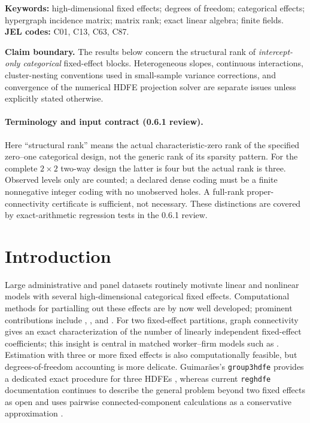 \documentclass[11pt]{article}
\theoremstyle{definition}
\newcommand{\1}{\mathbf{1}}
\begin{document}
\noindent\textbf{Keywords:} high-dimensional fixed effects; degrees of freedom; categorical effects; hypergraph incidence matrix; matrix rank; exact linear algebra; finite fields.\\
\textbf{JEL codes:} C01, C13, C63, C87.

\vspace{0.75em}
\noindent\textbf{Claim boundary.} The results below concern the structural rank of \emph{intercept-only categorical} fixed-effect blocks. Heterogeneous slopes, continuous interactions, cluster-nesting conventions used in small-sample variance corrections, and convergence of the numerical HDFE projection solver are separate issues unless explicitly stated otherwise.

\paragraph{Terminology and input contract (0.6.1 review).}
Here ``structural rank'' means the actual characteristic-zero rank of the specified
zero--one categorical design, not the generic rank of its sparsity pattern.
For the complete $2\times2$ two-way design the latter is four but the actual rank
is three. Observed levels only are counted; a declared dense coding must be a
finite nonnegative integer coding with no unobserved holes. A full-rank
proper-connectivity certificate is sufficient, not necessary. These distinctions
are covered by exact-arithmetic regression tests in the 0.6.1 review.

\section{Introduction}

Large administrative and panel datasets routinely motivate linear and nonlinear models with several high-dimensional categorical fixed effects. Computational methods for partialling out these effects are by now well developed; prominent contributions include \citet{GuimaraesPortugal2010}, \citet{Gaure2013}, and \citet{Correia2017}. For two fixed-effect partitions, graph connectivity gives an exact characterization of the number of linearly independent fixed-effect coefficients; this insight is central in matched worker--firm models such as \citet{AbowdCreecyKramarz2002}. Estimation with three or more fixed effects is also computationally feasible, but degrees-of-freedom accounting is more delicate. Guimar\~aes's \texttt{group3hdfe} provides a dedicated exact procedure for three HDFEs \citep{Guimaraes2016group3hdfe}, whereas current \texttt{reghdfe} documentation continues to describe the general problem beyond two fixed effects as open and uses pairwise connected-component calculations as a conservative approximation \citep{CorreiaConstantine2026reghdfe}.
\end{document}

